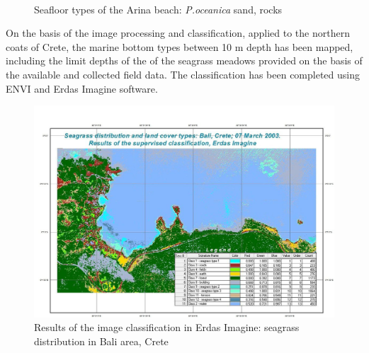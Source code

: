 \documentclass[10pt, a4paper]{article}
\begin{document}
\begin{figure}
	\centering
	\\
	\caption{Seafloor types of the Arina beach: \textit{P.oceanica} sand, rocks}
	\label{fig:37}
\end{figure}

On the basis of the image processing and classification, applied to the northern coats of Crete, the
marine bottom types between 10 m depth has been mapped, including the limit depths of the of the
seagrass meadows provided on the basis of the available and collected field data. The classification
has been completed using ENVI and Erdas Imagine software.

\begin{figure}
\begin{center}
\includegraphics[scale=0.40]{Fig-36.jpg}
\caption{Results of the image classification in Erdas Imagine: seagrass distribution in Bali area, Crete}
\label{fig:38}
\end{center}
\end{figure}
\end{document}
